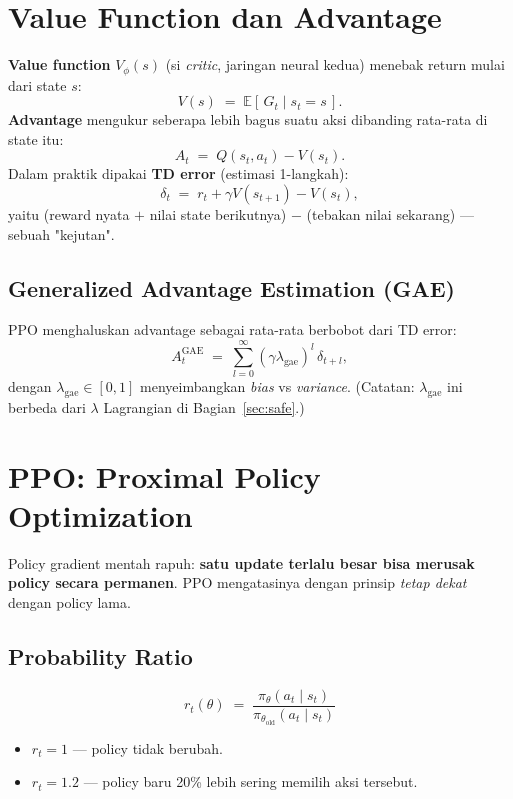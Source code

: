 \documentclass[11pt,a4paper]{article}
\newcommand{\E}{\mathbb{E}}
\begin{document}
\section{Value Function dan Advantage}
\textbf{Value function} $V_\phi(s)$ (si \emph{critic}, jaringan neural kedua)
menebak return mulai dari state $s$:
\[ V(s) \;=\; \E\!\left[\, G_t \mid s_t = s \,\right]. \]
\textbf{Advantage} mengukur seberapa lebih bagus suatu aksi dibanding rata-rata di state itu:
\[ A_t \;=\; Q(s_t,a_t) - V(s_t). \]
Dalam praktik dipakai \textbf{TD error} (estimasi 1-langkah):
\[ \delta_t \;=\; r_t + \gamma V(s_{t+1}) - V(s_t), \]
yaitu (reward nyata $+$ nilai state berikutnya) $-$ (tebakan nilai sekarang) --- sebuah "kejutan".

\subsection{Generalized Advantage Estimation (GAE)}
PPO menghaluskan advantage sebagai rata-rata berbobot dari TD error:
\[ A_t^{\mathrm{GAE}} \;=\; \sum_{l=0}^{\infty} (\gamma \lambda_{\mathrm{gae}})^{l}\, \delta_{t+l}, \]
dengan $\lambda_{\mathrm{gae}}\in[0,1]$ menyeimbangkan \emph{bias} vs \emph{variance}.
(Catatan: $\lambda_{\mathrm{gae}}$ ini berbeda dari $\lambda$ Lagrangian di Bagian~\ref{sec:safe}.)

\section{PPO: Proximal Policy Optimization}
Policy gradient mentah rapuh: \textbf{satu update terlalu besar bisa merusak policy
secara permanen}. PPO mengatasinya dengan prinsip \emph{tetap dekat} dengan policy lama.

\subsection{Probability Ratio}
\[ r_t(\theta) \;=\; \frac{\pi_\theta(a_t\mid s_t)}{\pi_{\theta_{\mathrm{old}}}(a_t\mid s_t)} \]
\begin{itemize}[nosep]
  \item $r_t = 1$ --- policy tidak berubah.
  \item $r_t = 1.2$ --- policy baru 20\% lebih sering memilih aksi tersebut.
\end{itemize}
\end{document}
